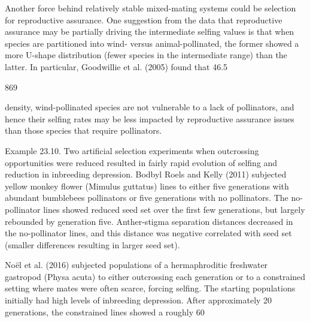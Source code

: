 \documentclass{article}
\begin{document}
Another force behind relatively stable mixed-mating systems could be selection for reproductive assurance. One suggestion from the data that reproductive assurance may be partially driving the intermediate selfing values is that when species are partitioned into wind- versus animal-pollinated, the former showed a more U-shape distribution (fewer species in the intermediate range) than the latter. In particular, Goodwillie et al. (2005) found that 46.5%

869

density, wind-pollinated species are not vulnerable to a lack of pollinators, and hence their selfing rates may be less impacted by reproductive assurance issues than those species that require pollinators.

Example 23.10. Two artificial selection experiments when outcrossing opportunities were reduced resulted in fairly rapid evolution of selfing and reduction in inbreeding depression. Bodbyl Roels and Kelly (2011) subjected yellow monkey flower (Mimulus guttatus) lines to either five generations with abundant bumblebees pollinators or five generations with no pollinators. The no-pollinator lines showed reduced seed set over the first few generations, but largely rebounded by generation five. Anther-stigma separation distances decreased in the no-pollinator lines, and this distance was negative correlated with seed set (smaller differences resulting in larger seed set).

Noël et al. (2016) subjected populations of a hermaphroditic freshwater gastropod (Physa acuta) to either outcrossing each generation or to a constrained setting where mates were often scarce, forcing selfing. The starting populations initially had high levels of inbreeding depression. After approximately 20 generations, the constrained lines showed a roughly 60%
\end{document}
